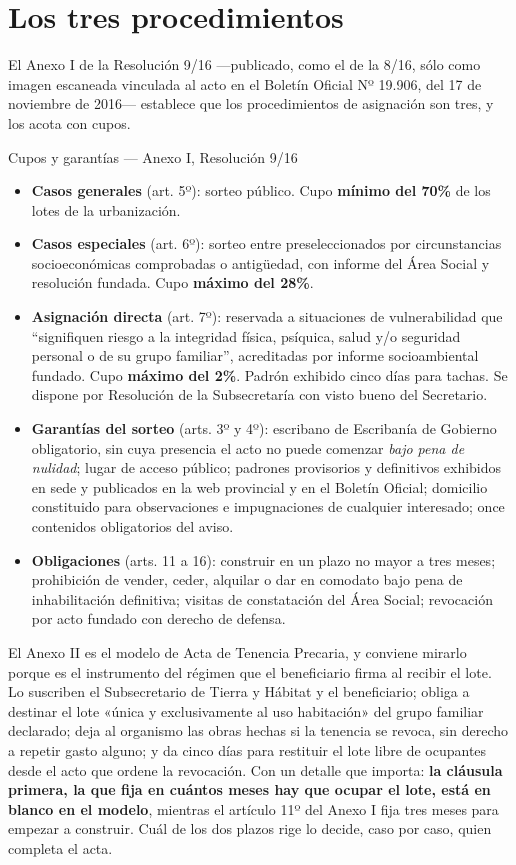 \section{Los tres procedimientos}

El Anexo I de la Resolución 9/16 ---publicado, como el de la 8/16, sólo como imagen escaneada vinculada al acto en el Boletín Oficial Nº 19.906, del 17 de noviembre de 2016--- establece que los procedimientos de asignación son tres, y los acota con cupos.

\begin{ficha}{Cupos y garantías --- Anexo I, Resolución 9/16}
\begin{itemize}[leftmargin=*,nosep]
\item \textbf{Casos generales} (art. 5º): sorteo público. Cupo \textbf{mínimo del 70\%} de los lotes de la urbanización.
\item \textbf{Casos especiales} (art. 6º): sorteo entre preseleccionados por circunstancias socioeconómicas comprobadas o antigüedad, con informe del Área Social y resolución fundada. Cupo \textbf{máximo del 28\%}.
\item \textbf{Asignación directa} (art. 7º): reservada a situaciones de vulnerabilidad que ``signifiquen riesgo a la integridad física, psíquica, salud y/o seguridad personal o de su grupo familiar'', acreditadas por informe socioambiental fundado. Cupo \textbf{máximo del 2\%}. Padrón exhibido cinco días para tachas. Se dispone por Resolución de la Subsecretaría con visto bueno del Secretario.
\item \textbf{Garantías del sorteo} (arts. 3º y 4º): escribano de Escribanía de Gobierno obligatorio, sin cuya presencia el acto no puede comenzar \textit{bajo pena de nulidad}; lugar de acceso público; padrones provisorios y definitivos exhibidos en sede y publicados en la web provincial y en el Boletín Oficial; domicilio constituido para observaciones e impugnaciones de cualquier interesado; once contenidos obligatorios del aviso.
\item \textbf{Obligaciones} (arts. 11 a 16): construir en un plazo no mayor a tres meses; prohibición de vender, ceder, alquilar o dar en comodato bajo pena de inhabilitación definitiva; visitas de constatación del Área Social; revocación por acto fundado con derecho de defensa.
\end{itemize}
\end{ficha}

El Anexo II es el modelo de Acta de Tenencia Precaria, y conviene mirarlo porque es el instrumento del régimen que el beneficiario firma al recibir el lote. Lo suscriben el Subsecretario de Tierra y Hábitat y el beneficiario; obliga a destinar el lote «única y exclusivamente al uso habitación» del grupo familiar declarado; deja al organismo las obras hechas si la tenencia se revoca, sin derecho a repetir gasto alguno; y da cinco días para restituir el lote libre de ocupantes desde el acto que ordene la revocación. Con un detalle que importa: \textbf{la cláusula primera, la que fija en cuántos meses hay que ocupar el lote, está en blanco en el modelo}, mientras el artículo 11º del Anexo I fija tres meses para empezar a construir. Cuál de los dos plazos rige lo decide, caso por caso, quien completa el acta.

